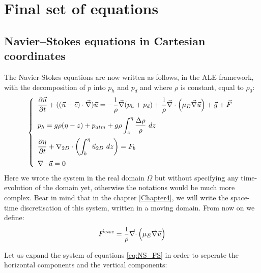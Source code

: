\section{Final set of equations}\label{sec:FS-NS}

\subsection{Navier--Stokes equations in Cartesian coordinates}

The Navier-Stokes equations are now written as follows, in the ALE framework,
with the decomposition of $p$ into $p_h$ and $p_d$ and where $\rho$ is constant, equal to $\rho_0$:
\begin{equation}
\left\{\begin{array}{l}
  \displaystyle{\dfrac{\partial \vec{u} }{\partial t} + ((\vec{u}-\vec{c}) \cdot \Grad) \vec{u} = -\dfrac{1}{\rho} \Grad (p_h+p_d) + \dfrac{1}{\rho} \BDiv \left(\mu_E \Grad \vec{u}\right)+ \vec{g} + \vec{F}}\medskip\\
  \displaystyle{p_h = g\rho(\eta-z) + p_{atm} + g\rho\int_z^\eta\dfrac{\Delta\rho}{\rho}~dz}\medskip\\
  \displaystyle{\dfrac{\partial\eta}{\partial t}
  + \DivD\left(\int_b^\eta\vec{u}_{2D}~dz\right) = F_b} \medskip \\
  \displaystyle{\Div \vec{u} = 0}
  \label{eq:NS_FS}
\end{array}\right.
\end{equation}
Here we wrote the system in the real domain $\Omega$ but without specifying any time-evolution of the domain yet, otherwise
the notations would be much more complex. Bear in mind that in the chapter \ref{Chapter4}, we will
write the space-time discretisation of this system, written in a moving domain.
From now on we define:
\begin{align}
  \vec{F}^{visc}= \dfrac{1}{\rho} \vec{\nabla \cdot} \left(\mu_E \vec \nabla \vec{u}\right)
  \label{eq:visc_forces}
\end{align}

Let us expand the system of equations \eqref{eq:NS_FS} in order to seperate the horizontal components and the vertical components:

